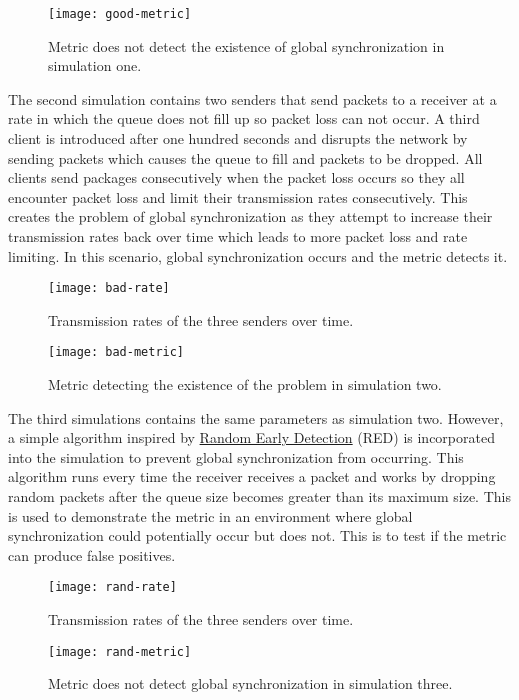 \documentclass{article}
\begin{document}
	\begin{figure}[H]
		\centering
		\texttt{[image: good-metric]}
		\caption{Metric does not detect the existence of global synchronization in simulation one.}
	\end{figure}
	
	The second simulation contains two senders that send packets to a receiver at a rate in which the queue does not fill up so packet loss can not occur. A third client is introduced after one hundred seconds and disrupts the network by sending packets which causes the queue to fill and packets to be dropped. All clients send packages consecutively when the packet loss occurs so they all encounter packet loss and limit their transmission rates consecutively. This creates the problem of global synchronization as they attempt to increase their transmission rates back over time which leads to more packet loss and rate limiting. In this scenario, global synchronization occurs and the metric detects it.

	\begin{figure}[H]
		\centering
		\texttt{[image: bad-rate]}
		\caption{Transmission rates of the three senders over time.}
	\end{figure}
	
	\begin{figure}[H]
		\centering
		\texttt{[image: bad-metric]}
		\caption{Metric detecting the existence of the problem in simulation two.}
	\end{figure}
	
	The third simulations contains the same parameters as simulation two. However, a simple algorithm inspired by \href{https://en.wikipedia.org/wiki/Random_early_detection}{Random Early Detection} (RED) is incorporated into the simulation to prevent global synchronization from occurring. This algorithm runs every time the receiver receives a packet and works by dropping random packets after the queue size becomes greater than its maximum size. This is used to demonstrate the metric in an environment where global synchronization could potentially occur but does not. This is to test if the metric can produce false positives.
	
	\begin{figure}[H]
		\centering
		\texttt{[image: rand-rate]}
		\caption{Transmission rates of the three senders over time.}
	\end{figure}
	
	\begin{figure}[H]
		\centering
		\texttt{[image: rand-metric]}
		\caption{Metric does not detect global synchronization in simulation three.}
	\end{figure}														
													
\end{document}
